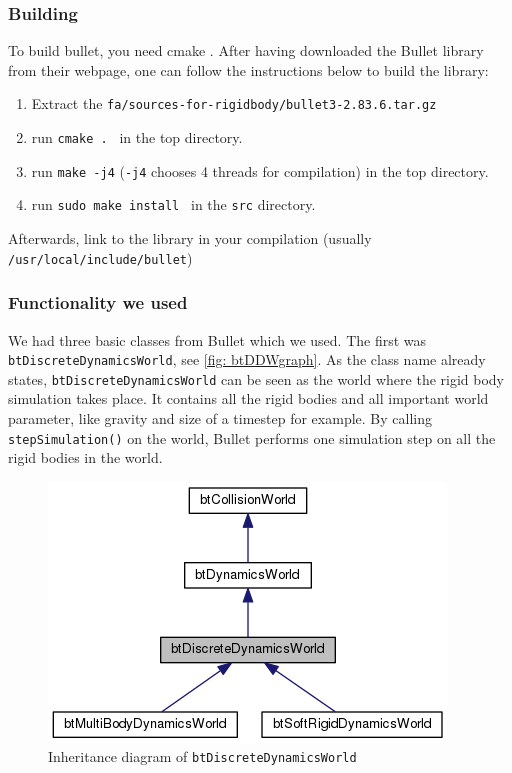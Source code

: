 \subsubsection{Building}
To build bullet, you need cmake \cite{CMake}. After having downloaded the Bullet library from their webpage, one can follow the instructions below to build the library:
\begin{enumerate}
\item Extract the \verb+fa/sources-for-rigidbody/bullet3-2.83.6.tar.gz +
\item run \verb+cmake . + in the top directory.
\item run \verb+make -j4+ (\verb+-j4+ chooses 4 threads for compilation) in the top directory.
\item run \verb+sudo make install + in the \verb+src+ directory.
\end{enumerate}
Afterwards, link to the library in your compilation (usually \verb+/usr/local/include/bullet+)
\subsubsection{Functionality we used}
We had three basic classes from Bullet which we used. The first was \verb+btDiscreteDynamicsWorld+, see \autoref{fig: btDDWgraph}. As the class name already states, \verb+btDiscreteDynamicsWorld+ can be seen as the world where the rigid body simulation takes place. It contains all the rigid bodies and all important world parameter, like gravity and size of a timestep for example. By calling \verb+stepSimulation()+ on the world, Bullet performs one simulation step on all the rigid bodies in the world.
\begin{figure}
\centering
\includegraphics[scale=0.5]{img/RigidBodies/btDiscreteDynamicsWorldGraph.png}
\caption{Inheritance diagram of \texttt{btDiscreteDynamicsWorld}}
\label{fig: btDDWgraph}
\end{figure}


